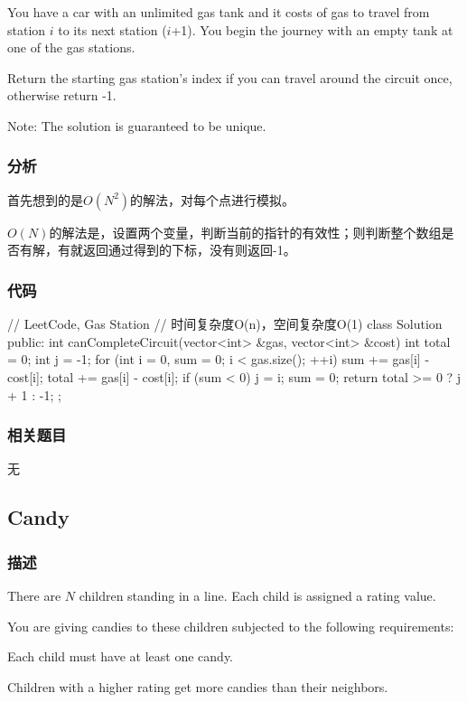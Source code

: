 You have a car with an unlimited gas tank and it costs  of gas to travel from station $i$ to its next station ($i$+1). You begin the journey with an empty tank at one of the gas stations.

Return the starting gas station's index if you can travel around the circuit once, otherwise return -1.

Note:
The solution is guaranteed to be unique.


\subsubsection{分析}
首先想到的是$O(N^2)$的解法，对每个点进行模拟。

$O(N)$的解法是，设置两个变量，判断当前的指针的有效性；则判断整个数组是否有解，有就返回通过得到的下标，没有则返回-1。


\subsubsection{代码}
\begin{Code}
// LeetCode, Gas Station
// 时间复杂度O(n)，空间复杂度O(1)
class Solution {
public:
    int canCompleteCircuit(vector<int> &gas, vector<int> &cost) {
        int total = 0;
        int j = -1;
        for (int i = 0, sum = 0; i < gas.size(); ++i) {
            sum += gas[i] - cost[i];
            total += gas[i] - cost[i];
            if (sum < 0) {
                j = i;
                sum = 0;
            }
        }
        return total >= 0 ? j + 1 : -1;
    }
};
\end{Code}


\subsubsection{相关题目}
\begindot
\item 无
\myenddot


\subsection{Candy} %
\label{sec:candy}


\subsubsection{描述}
There are $N$ children standing in a line. Each child is assigned a rating value.

You are giving candies to these children subjected to the following requirements:
\begindot
\item Each child must have at least one candy.
\item Children with a higher rating get more candies than their neighbors.
\myenddot

